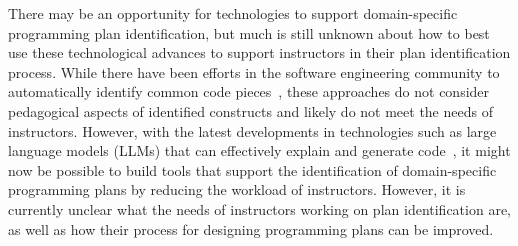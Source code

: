 There may be an opportunity for technologies to support domain-specific programming plan identification, but much is still unknown about how to best use these technological advances to support instructors in their plan identification process.
While there have been efforts in the software engineering community to automatically identify common code pieces~\cite{haggis_code_similarity, jezero_code_similarity, code_similarity_newest}, these approaches do not consider pedagogical aspects of identified constructs and likely do not meet the needs of instructors. However, with the latest developments in technologies such as large language models (LLMs) that can effectively explain and generate code~\cite{juryEvaluatingLLMgeneratedWorked2024a}, it might now be possible to build tools that support the identification of domain-specific programming plans by reducing the workload of instructors. %
However, it is currently unclear what the needs of instructors working on plan identification are, as well as how their process for designing programming plans can be improved. 



